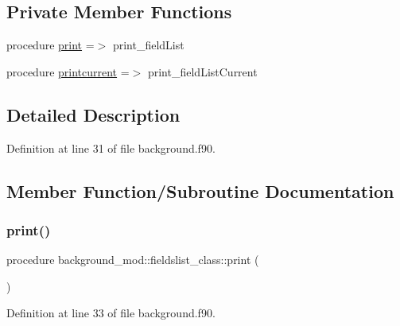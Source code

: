 \subsection*{Private Member Functions}
\begin{DoxyCompactItemize}
\item 
procedure \mbox{\hyperlink{structbackground__mod_1_1fieldslist__class_ae1d99fa977608f612eba0988a0cb3a62}{print}} =$>$ print\+\_\+field\+List
\item 
procedure \mbox{\hyperlink{structbackground__mod_1_1fieldslist__class_a80857111b9ee7349300f604ec1e256f4}{printcurrent}} =$>$ print\+\_\+field\+List\+Current
\end{DoxyCompactItemize}


\subsection{Detailed Description}


Definition at line 31 of file background.\+f90.



\subsection{Member Function/\+Subroutine Documentation}
\mbox{\label{structbackground__mod_1_1fieldslist__class_ae1d99fa977608f612eba0988a0cb3a62}} 
\subsubsection{\texorpdfstring{print()}{print()}}
{\footnotesize\ttfamily procedure background\+\_\+mod\+::fieldslist\+\_\+class\+::print (\begin{DoxyParamCaption}{ }\end{DoxyParamCaption})\hspace{0.3cm}{\ttfamily [private]}}



Definition at line 33 of file background.\+f90.

\mbox{\label{structbackground__mod_1_1fieldslist__class_a80857111b9ee7349300f604ec1e256f4}} 
